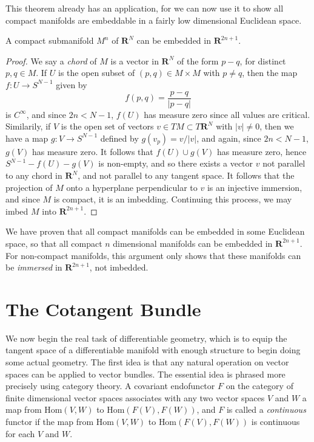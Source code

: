 This theorem already has an application, for we can now use it to show all compact manifolds are embeddable in a fairly low dimensional Euclidean space.

\begin{theorem}
    A compact submanifold $M^n$ of $\mathbf{R}^N$ can be embedded in $\mathbf{R}^{2n+1}$.
\end{theorem}
\begin{proof}
    We say a {\it chord} of $M$ is a vector in $\mathbf{R}^N$ of the form $p - q$, for distinct $p,q \in M$. If $U$ is the open subset of $(p,q) \in M \times M$ with $p \neq q$, then the map $f: U \to S^{N-1}$ given by
    \[ f(p,q) = \frac{p-q}{|p-q|} \]
    is $C^\infty$, and since $2n < N-1$, $f(U)$ has measure zero since all values are critical. Similarily, if $V$ is the open set of vectors $v \in TM \subset T\mathbf{R}^N$ with $|v| \neq 0$, then we have a map $g: V \to S^{N-1}$ defined by $g(v_p) = v/|v|$, and again, since $2n < N-1$, $g(V)$ has measure zero. It follows that $f(U) \cup g(V)$ has measure zero, hence $S^{N-1} - f(U) - g(V)$ is non-empty, and so there exists a vector $v$ not parallel to any chord in $\mathbf{R}^N$, and not parallel to any tangent space. It follows that the projection of $M$ onto a hyperplane perpendicular to $v$ is an injective immersion, and since $M$ is compact, it is an imbedding. Continuing this process, we may imbed $M$ into $\mathbf{R}^{2n+1}$.
\end{proof}

We have proven that all compact manifolds can be embedded in some Euclidean space, so that all compact $n$ dimensional manifolds can be embedded in $\mathbf{R}^{2n+1}$. For non-compact manifolds, this argument only shows that these manifolds can be {\it immersed} in $\mathbf{R}^{2n+1}$, not imbedded.

\chapter{The Cotangent Bundle}

We now begin the real task of differentiable geometry, which is to equip the tangent space of a differentiable manifold with enough structure to begin doing some actual geometry. The first idea is that any natural operation on vector spaces can be applied to vector bundles. The essential idea is phrased more precisely using category theory. A covariant endofunctor $F$ on the category of finite dimensional vector spaces associates with any two vector spaces $V$ and $W$ a map from $\text{Hom}(V,W)$ to $\text{Hom}(F(V),F(W))$, and $F$ is called a {\it continuous} functor if the map from $\text{Hom}(V,W)$ to $\text{Hom}(F(V),F(W))$ is continuous for each $V$ and $W$.

